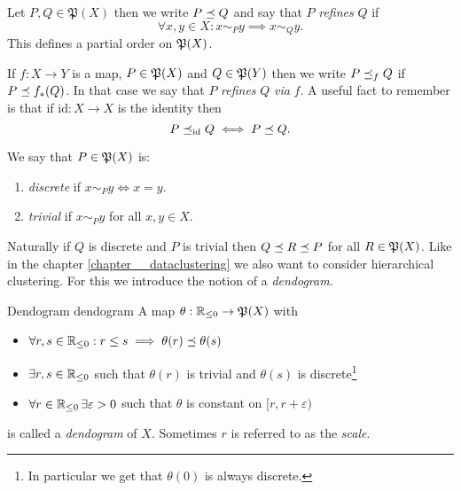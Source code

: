 \begin{definition}{}{}
Let $P, Q \in \mathfrak{P}(X)$ then we write $P \refines Q$ and say that $P$ \emph{refines} $Q$ if
\begin{equation*}
    \forall x,y \in X: x \sim_P y \implies x \sim_Q y.
\end{equation*}
This defines a partial order on $\P(X)$.
\end{definition}
If $f: X \to Y$ is a map, $P \in \P(X)$ and $Q \in \P(Y)$ then we write $P \refines_f Q$ if $P \refines f_*(Q)$. In that case we say that $P$ \emph{refines} $Q$ \emph{via} $f$. A useful fact to remember is that if $\mathrm{id}: X \to X$ is the identity then
\begin{equation}
    \label{eq:refinement_via_identity}
    P \refines_{\mathrm{id}} Q \iff P \refines Q.
\end{equation}
\begin{definition}{}{}
We say that $P \in \P(X)$ is:
\begin{enumerate}
    \item \emph{discrete} if $x \sim_P y \iff x = y$.
    \item \emph{trivial} if $x \sim_P y$ for all $x,y \in X$.
\end{enumerate}
\end{definition}

Naturally if $Q$ is discrete and $P$ is trivial then $Q \refines R \refines P$ for all $R \in \P(X)$.
Like in the chapter \ref{chapter__dataclustering} we also want to consider hierarchical clustering.
For this we introduce the notion of a \emph{dendogram}.

\begin{definition}{Dendogram \cite[Def.~2.2]{Carlsson2010}}{dendogram}
A map $\theta: \R_{\leq0} \to \mathfrak{P}(X)$ with
\begin{itemize}
    \item $\forall r,s \in \R_{\leq0}: r \leq s \implies  \theta(r) \refines \theta(s)$
    \item $\exists r,s \in \R_{\leq0}$ such that $\theta(r)$ is trivial and $\theta(s)$ is discrete\footnote{In particular we get that $\theta(0)$ is always discrete.\todo[]}
    \item $\forall r \in \R_{\leq0} \,\exists \varepsilon > 0$ such that $\theta$ is constant on $[r, r + \varepsilon)$
\end{itemize}
is called a \emph{dendogram} of $X$. Sometimes $r$ is referred to as the \emph{scale}.
\end{definition}

